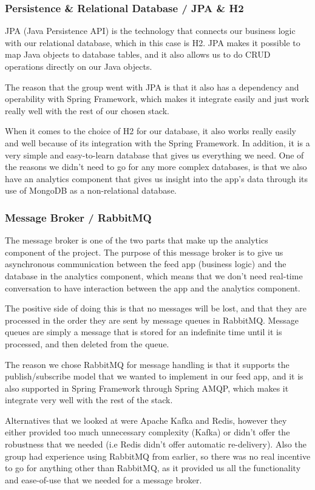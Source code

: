 \subsubsection{Persistence \& Relational Database / JPA \& H2}
JPA (Java Persistence API) is the technology that connects our business logic with our relational database, which in this case is H2. JPA makes it possible to map Java objects to database tables, and it also allows us to do CRUD operations directly on our Java objects. 

The reason that the group went with JPA is that it also has a dependency and operability with Spring Framework, which makes it integrate easily and just work really well with the rest of our chosen stack.

When it comes to the choice of H2 for our database, it also works really easily and well because of its integration with the Spring Framework. In addition, it is a very simple and easy-to-learn database that gives us everything we need. One of the reasons we didn't need to go for any more complex databases, is that we also have an analytics component that gives us insight into the app’s data through its use of MongoDB as a non-relational database.

\subsubsection{Message Broker / RabbitMQ}
The message broker is one of the two parts that make up the analytics component of the project. The purpose of this message broker is to give us asynchronous communication between the feed app (business logic) and the database in the analytics component, which means that we don’t need real-time conversation to have interaction between the app and the analytics component. 

The positive side of doing this is that no messages will be lost, and that they are processed in the order they are sent by message queues in RabbitMQ. Message queues are simply a message that is stored for an indefinite time until it is processed, and then deleted from the queue.

The reason we chose RabbitMQ for message handling is that it supports the publish/subscribe model that we wanted to implement in our feed app, and it is also supported in Spring Framework through Spring AMQP, which makes it integrate very well with the rest of the stack.

Alternatives that we looked at were Apache Kafka and Redis, however they either provided too much unnecessary complexity (Kafka) or didn't offer the robustness that we needed (i.e Redis didn’t offer automatic re-delivery). Also the group had experience using RabbitMQ from earlier, so there was no real incentive to go for anything other than RabbitMQ, as it provided us all the functionality and ease-of-use that we needed for a message broker.

